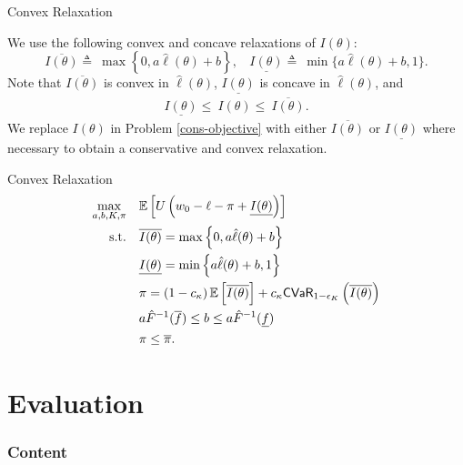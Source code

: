 \documentclass{beamer}
\begin{document}
\begin{frame}{Convex Relaxation}

    We use the following convex and concave relaxations of $I(\theta)$: 
    \[
    \overline{I(\theta)} \triangleq\ \max \left \{ 0,a\hat{\ell}(\theta) + b\right \},\ \ \ \ 
    \underline{I(\theta)} \triangleq\ \min \{ a\hat{\ell}(\theta) + b,1 \}.
    \]
    Note that $\overline{I(\theta)}$ is convex in $\hat{\ell}(\theta)$, $\underline{I(\theta)}$ is concave in $\hat{\ell}(\theta)$, and
    \begin{align*}
    \underline{I(\theta)} \leq\ I(\theta) \leq\ \overline{I(\theta)}.
    \end{align*}
 We replace $I(\theta)$ in Problem \eqref{cons-objective} with either $\overline{I(\theta)}$ or $\underline{I(\theta)}$ where necessary to obtain a conservative and convex relaxation. 
\end{frame}

\begin{frame}{Convex Relaxation}
    \begin{align}
        \max_{a,b,K,\pi} &\quad \mathbb{E} \left [  U\left(w_0 - \ell - \pi  +  \underline{I(\theta)} \right) \right ]\label{eq-06}\\
        \text{s.t.} & \quad \overline{I(\theta)} = \max \left \{0,a\hat{\ell}(\theta) + b \right \} \nonumber\\
        & \quad \underline{I(\theta)} = \min \left \{a\hat{\ell}(\theta)+b,1 \right \} \nonumber\\
        & \quad \pi = \left (1-c_{\kappa} \right ) \mathbb{E} \left [ \overline{I(\theta)} \right ] + c_{\kappa} {\sf CVaR}_{1-\epsilon_K} \left( \overline{I(\theta)} \right) \label{eq-41}\\
        & \quad a \hat{F}^{-1}(\overline{f}) \leq b \leq a\hat{F}^{-1}(\underline{f})\\
        & \quad \pi \leq \overline{\pi} \nonumber.
  \end{align}
    
\end{frame}

\section{Evaluation}
\begin{frame}
    \frametitle{Content}
    \tableofcontents[currentsection]
  \end{frame}
\end{document}
